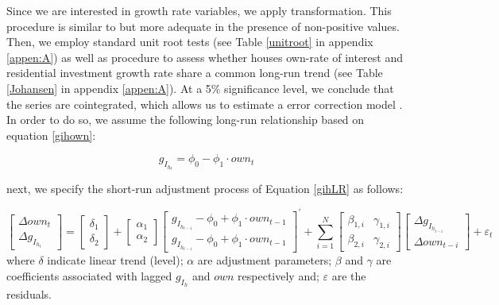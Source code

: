 \documentclass[12pt, a4paper]{article}
\begin{document}
Since we are interested in growth rate variables, we apply \textcite{yeo_new_2000} transformation.
This procedure is similar to \textcite{box_analysis_1964} but more adequate in the presence of non-positive values.
Then, we employ standard unit root tests (see Table \ref{unitroot} in appendix \ref{appen:A}) as well as \textcite{johansen_estimation_1991} procedure to assess whether houses own-rate of interest and residential investment growth rate share a common long-run trend (see Table \ref{Johansen} in appendix \ref{appen:A}).
At a 5\% significance level, we conclude that the series are cointegrated, which allows us to estimate a error correction model \cite{enders_applied_2014}.
In order to do so, we assume the following long-run relationship based on equation \ref{gihown}:

\begin{latex}
\begin{equation}
\label{gihLR}
g_{I_{h_{t}}} = \phi_{0} - \phi_{1}\cdot own_{t}
\end{equation}
\end{latex}
next, we specify the short-run adjustment process of Equation \ref{gihLR} as follows:

\begin{equation}
\label{matrix}
\begin{bmatrix}
\Delta own_{t}\\
\Delta g_{I_{h_{t}}}
\end{bmatrix} = \begin{bmatrix}\delta_{1}\\ \delta_{2}\end{bmatrix} + \begin{bmatrix}\alpha_{1}\\ \alpha_{2}\end{bmatrix} \begin{bmatrix}g_{I_{h_{t-1}}} - \phi_{0} + \phi_{1}\cdot own_{t-1}\\g_{I_{h_{t-1}}} - \phi_{0} + \phi_{1}\cdot own_{t-1}\end{bmatrix}^{\prime} + \sum^N_{i=1} \begin{bmatrix}\beta_{1,i} & \gamma_{1,i} \\\beta_{2,i} & \gamma_{2,i} \end{bmatrix} \begin{bmatrix}\Delta g_{I_{h_{t-i}}} \\\Delta own_{t-i}\end{bmatrix} + \varepsilon_{t}
\end{equation}
where \(\delta\) indicate linear trend (level);
\(\alpha\) are adjustment parameters;
\(\beta\) and \(\gamma\) are coefficients associated with lagged \(g_{I_h}\) and \(own\) respectively and; \(\varepsilon\) are the residuals.
\end{document}
